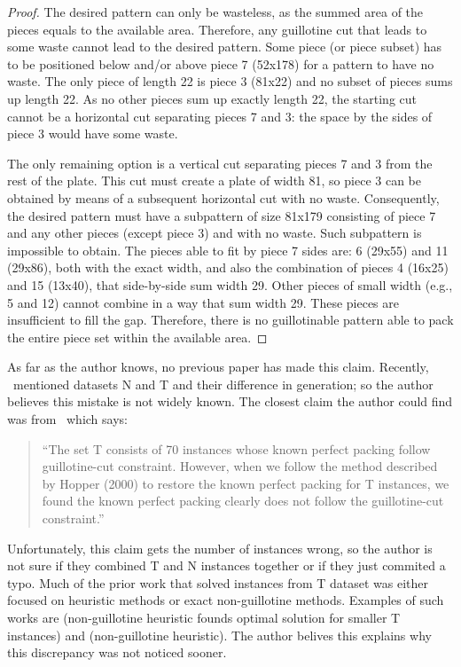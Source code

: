 \documentclass[ppgc,tese,english,formais,babel]{iiufrgs}
\begin{document}
\noindent
\begin{proof}
The desired pattern can only be wasteless, as the summed area of the pieces equals to the available area.
Therefore, any guillotine cut that leads to some waste cannot lead to the desired pattern.
Some piece (or piece subset) has to be positioned below and/or above piece 7 (52x178) for a pattern to have no waste.
The only piece of length 22 is piece 3 (81x22) and no subset of pieces sums up length 22.
As no other pieces sum up exactly length 22, the starting cut cannot be a horizontal cut separating pieces 7 and 3: the space by the sides of piece 3 would have some waste.

The only remaining option is a vertical cut separating pieces 7 and 3 from the rest of the plate.
This cut must create a plate of width 81, so piece 3 can be obtained by means of a subsequent horizontal cut with no waste.
Consequently, the desired pattern must have a subpattern of size 81x179 consisting of piece 7 and any other pieces (except piece 3) and with no waste.
Such subpattern is impossible to obtain.
The pieces able to fit by piece 7 sides are: 6 (29x55) and 11 (29x86), both with the exact width, and also the combination of pieces 4 (16x25) and 15 (13x40), that side-by-side sum width 29.
Other pieces of small width (e.g., 5 and 12) cannot combine in a way that sum width 29.
These pieces are insufficient to fill the gap.
Therefore, there is no guillotinable pattern able to pack the entire piece set within the available area.

\end{proof}

As far as the author knows, no previous paper has made this claim.
Recently, \citet{what_matters}~mentioned datasets N and T and their difference in generation; so the author believes this mistake is not widely known.
The closest claim the author could find was from~\citet{wei:2014} which says:
\begin{quote}
``The set T consists of 70 instances whose known perfect packing follow guillotine-cut constraint. However, when we follow the method described by Hopper (2000) to restore the known perfect packing for T instances, we found the known perfect packing clearly does not follow the guillotine-cut constraint.''
\end{quote}
Unfortunately, this claim gets the number of instances wrong, so the author is not sure if they combined T and N instances together or if they just commited a typo.
Much of the prior work that solved instances from T dataset was either focused on heuristic methods or exact non-guillotine methods.
Examples of such works are
\citet{alvarez:2008} (non-guillotine heuristic founds optimal solution for smaller T instances) and %
\citet{wei:2011} (non-guillotine heuristic).
The author belives this explains why this discrepancy was not noticed sooner.
\end{document}
